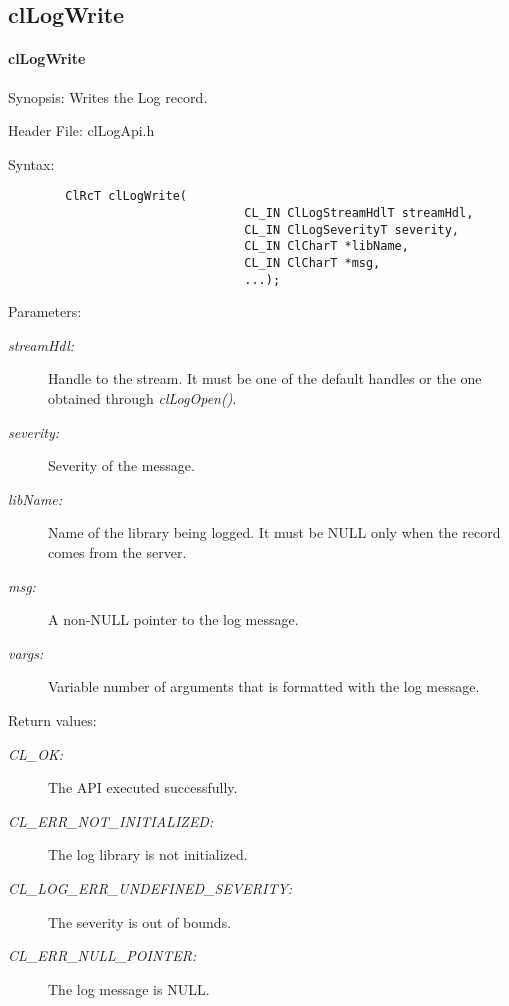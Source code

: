 \subsection{clLogWrite}
\hypertarget{pagelog102}{}\paragraph{cl\-Log\-Write}\label{pagelog102}
\begin{Desc}
\item[Synopsis:]Writes the Log record.\end{Desc}
\begin{Desc}
\item[Header File:]clLogApi.h\end{Desc}
\begin{Desc}
\item[Syntax:]

\footnotesize\begin{verbatim}        ClRcT clLogWrite(
                                 CL_IN ClLogStreamHdlT streamHdl,
                                 CL_IN ClLogSeverityT severity,
                                 CL_IN ClCharT *libName,
                                 CL_IN ClCharT *msg,
                                 ...);
\end{verbatim}
\normalsize
\end{Desc}
\begin{Desc}
\item[Parameters:]
\begin{description}
\item[{\em stream\-Hdl:}]Handle to the stream. It must be one of the default handles or the one obtained through
\textit{clLogOpen()}. \item[{\em severity:}]Severity of the message. \item[{\em lib\-Name:}]Name of the library being logged. It must be NULL only when the record comes from the server. \item[{\em msg:}]A non-NULL pointer to the log message. \item[{\em vargs:}]Variable number of arguments that is formatted with the log message.\end{description}
\end{Desc}
\begin{Desc}
\item[Return values:]
\begin{description}
\item[{\em CL\_\-OK:}]The API executed successfully. \item[{\em CL\_\-ERR\_\-NOT\_\-INITIALIZED:}]The log library is not initialized. \item[{\em CL\_\-LOG\_\-ERR\_\-UNDEFINED\_\-SEVERITY:}]The severity is out of bounds. \item[{\em CL\_\-ERR\_\-NULL\_\-POINTER:}]The log message is NULL.\end{description}
\end{Desc}
